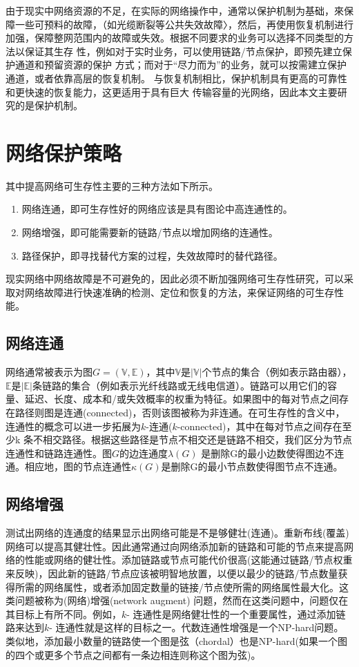 由于现实中网络资源的不足，在实际的网络操作中，通常以保护机制为基础，來保 障一些可预料的故障，（如光缆断裂等公共失效故障〉，然后，再使用恢复机制进行加强，保障整网范围内的故障或失效。根据不同要求的业务可以选择不同类型的方法以保证其生存 性，例如对于实时业务，可以使用链路/节点保护，即预先建立保护通道和预留资源的保护 方式；而对于“尽力而为”的业务，就可以按需建立保护通道，或者依靠高层的恢复机制。 与恢复机制相比，保护机制具有更高的可靠性和更快速的恢复能力，这更适用于具有巨大 传输容量的光网络，因此本文主要研究的是保护机制。
\section{网络保护策略}


其中提高网络可生存性主要的三种方法如下所示。
\begin{enumerate}
\item 网络连通，即可生存性好的网络应该是具有图论中高连通性的。
\item 网络增强，即可能需要新的链路/节点以增加网络的连通性。
\item 路径保护，即寻找替代方案的过程，失效故障时的替代路径。
\end{enumerate}


现实网络中网络故障是不可避免的，因此必须不断加强网络可生存性研究，可以采取对网络故障进行快速准确的检测、定位和恢复的方法，来保证网络的可生存性能。
\subsection{网络连通}
网络通常被表示为图$G=(\mathbb{\mathbb{V}},\mathbb{\mathbb{E}})$，其中$\mathbb{\mathbb{V}}$是$|\mathbb{\mathbb{V}}|$个节点的集合（例如表示路由器），$\mathbb{\mathbb{E}}$是$|\mathbb{\mathbb{E}}|$条链路的集合（例如表示光纤线路或无线电信道）。链路可以用它们的容量、延迟、长度、成本和/或失效概率的权重为特征。如果图中的每对节点之间存在路径则图是连通(connected)，否则该图被称为非连通。在可生存性的含义中，连通性的概念可以进一步拓展为$k$-连通($k$-connected)，其中在每对节点之间存在至少k 条不相交路径。根据这些路径是节点不相交还是链路不相交，我们区分为节点连通性和链路连通性。图$G$的边连通度$\lambda(G)$ 是删除G的最小边数使得图边不连通。相应地，图的节点连通性$\kappa(G)$是删除G的最小节点数使得图节点不连通。

\subsection{网络增强}
测试出网络的连通度的结果显示出网络可能是不是够健壮(连通)。重新布线(覆盖)网络可以提高其健壮性\cite{van2010influence}。因此通常通过向网络添加新的链路和可能的节点来提高网络的性能或网络的健壮性。添加链路或节点可能代价很高(这能通过链路/节点权重来反映)，因此新的链路/节点应该被明智地放置，以便以最少的链路/节点数量获得所需的网络属性，或者添加固定数量的链接/节点使所需的网络属性最大化。这类问题被称为(网络)增强(network augment) 问题，然而在这类问题中，问题仅在其目标上有所不同。例如，$k$- 连通性是网络健壮性的一个重要属性，通过添加链路来达到$k$- 连通性就是这样的目标之一。代数连通性增强是一个NP-hard问题\cite{mosk2008maximum}。 类似地，添加最小数量的链路使一个图是弦（chordal）也是NP-hard\cite{yannakakis1981computing}(如果一个图的四个或更多个节点之间都有一条边相连则称这个图为弦)。
